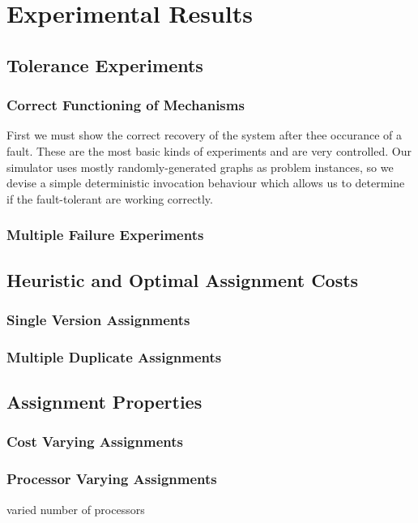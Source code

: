 \chapter{Experimental Results}
\label{chapExperiment}

\section{Tolerance Experiments}

\subsection{Correct Functioning of Mechanisms}

First we must show the correct recovery of the system after thee occurance of a fault.
These are the most basic kinds of experiments and are very controlled.
Our simulator uses mostly randomly-generated graphs as problem instances, so we devise a simple deterministic invocation behaviour which allows us to determine if the fault-tolerant are working correctly.



\subsection{Multiple Failure Experiments}

\section{Heuristic and Optimal Assignment Costs}

\subsection{Single Version Assignments}

\subsection{Multiple Duplicate Assignments}

\section{Assignment Properties}

\subsection{Cost Varying Assignments}

\subsection{Processor Varying Assignments}

varied number of processors
